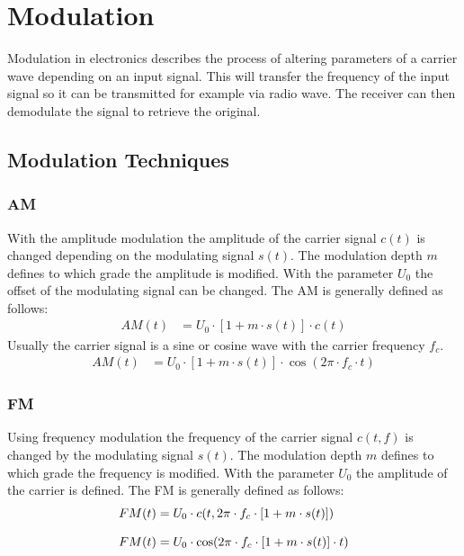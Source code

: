 \section{Modulation}\label{sec:theory:mod}

%
Modulation in electronics describes the process of altering parameters of a carrier wave depending on an input signal. This will transfer the frequency of the input signal so it can be transmitted for example via radio wave. The receiver can then demodulate the signal to retrieve the original.

\subsection{Modulation Techniques}

\subsubsection*{AM}
With the amplitude modulation the amplitude of the carrier signal $c(t)$ is changed depending on the modulating signal $s(t)$. The modulation depth $m$ defines to which grade the amplitude is modified. With the parameter $U_0$ the offset of the modulating signal can be changed.\p
The AM is generally defined as follows:
%
\begin{align}
  AM(t) &= U_0 \cdot [1 + m \cdot s(t)] \cdot c(t)
\end{align}
%
Usually the carrier signal is a sine or cosine wave with the carrier frequency $f_c$.
%
\begin{align}
  AM(t) &= U_0 \cdot [1 + m \cdot s(t)] \cdot \cos (2 \pi \cdot f_c \cdot t)\label{eq:theory:mod:am}
\end{align}
%
\subsubsection*{FM}
%
Using frequency modulation the frequency of the carrier signal $c(t, f)$ is changed by the modulating signal $s(t)$. The modulation depth $m$ defines to which grade the frequency is modified. With the parameter $U_0$ the amplitude of the carrier is defined.\p
The FM is generally defined as follows:
%
\begin{align}
  FM(t) &= U_0 \cdot c(t, 2 \pi \cdot f_c \cdot [1 + m \cdot s(t)])\pmath
  FM(t) &= U_0 \cdot \cos (2 \pi \cdot f_c \cdot [1 + m \cdot s(t)] \cdot t) \label{eq:theory:mod:fm}
\end{align}

